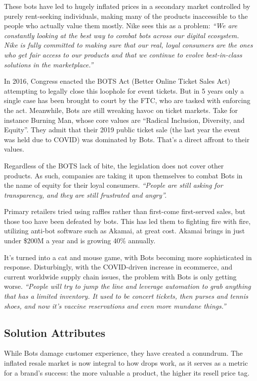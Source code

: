 \documentclass[runningheads]{llncs}
\begin{document}
These bots have led to hugely inflated prices in a secondary market controlled by purely rent-seeking individuals, making many of the products inaccessible to the people who actually value them mostly. Nike sees this as a problem: \emph{“We are constantly looking at the best way to combat bots across our digital ecosystem. Nike is fully committed to making sure that our real, loyal consumers are the ones who get fair access to our products and that we continue to evolve best-in-class solutions in the marketplace.”}\cite{nike-quote-Hunt}

In 2016, Congress enacted the BOTS Act (Better Online Ticket Sales Act) attempting to legally close this loophole for event tickets.\cite{online-ticket-Wiki-2021}  But in 5 years only a single case has been brought to court by the FTC, who are tasked with enforcing the act.\cite{bots-act-FTC-2021}  Meanwhile, Bots are still wreaking havoc on ticket markets.  Take for instance Burning Man, whose core values are “Radical Inclusion, Diversity, and Equity”.  They admit that their 2019 public ticket sale (the last year the event was held due to COVID) was dominated by Bots.\cite{2019-mainsale-BMP-2019}  That’s a direct affront to their values.

Regardless of the BOTS lack of bite, the legislation does not cover other products.  As such, companies are taking it upon themselves to combat Bots in the name of equity for their loyal consumers.  \emph{“People are still asking for transparency, and they are still frustrated and angry”.}\cite{jacque-slade-quote-Hunt}

Primary retailers tried using raffles rather than first-come first-served sales, but those too have been defeated by bots.  This has led them to fighting fire with fire, utilizing anti-bot software such as Akamai, at great cost.  Akamai brings in just under \$200M a year and is growing 40\% annually.\cite{bots-gifts-Hunt-2021}

It’s turned into a cat and mouse game, with Bots becoming more sophisticated in response.  Disturbingly, with the COVID-driven increase in ecommerce, and current worldwide supply chain issues, the problem with Bots is only getting worse.  \emph{“People will try to jump the line and leverage automation to grab anything that has a limited inventory.  It used to be concert tickets, then purses and tennis shoes, and now it’s vaccine reservations and even more mundane things.”}\cite{pat-sullivan-quote-Hunt}

\subsection{Solution Attributes} 
While Bots damage customer experience, they have created a conundrum.  The inflated resale market is now integral to how drops work, as it serves as a metric for a brand’s success: the more valuable a product, the higher its resell price tag.  
	
\end{document}
